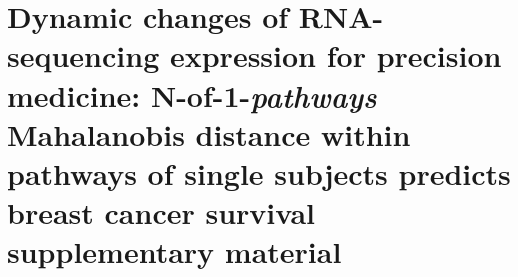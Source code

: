 \chapter{Dynamic changes of RNA-sequencing expression for precision medicine: N-of-1-\emph{pathways} Mahalanobis distance within pathways of single subjects predicts breast cancer survival supplementary material}
